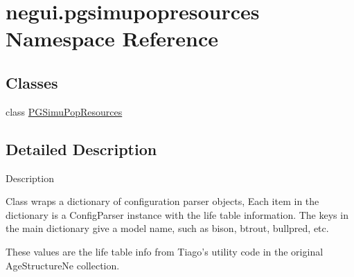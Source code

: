 \hypertarget{namespacenegui_1_1pgsimupopresources}{}\section{negui.\+pgsimupopresources Namespace Reference}
\label{namespacenegui_1_1pgsimupopresources}
\subsection*{Classes}
\begin{DoxyCompactItemize}
\item 
class \hyperlink{classnegui_1_1pgsimupopresources_1_1PGSimuPopResources}{P\+G\+Simu\+Pop\+Resources}
\end{DoxyCompactItemize}


\subsection{Detailed Description}
\begin{DoxyVerb}Description

Class wraps a dictionary of configuration parser
objects, Each item in the dictionary is 
a ConfigParser instance with the life table information. 
The keys in the main dictionary give a model name, such as 
bison, btrout, bullpred, etc.

These values are the life table info from Tiago's
utility code in the original AgeStructureNe 
collection.\end{DoxyVerb}
 
